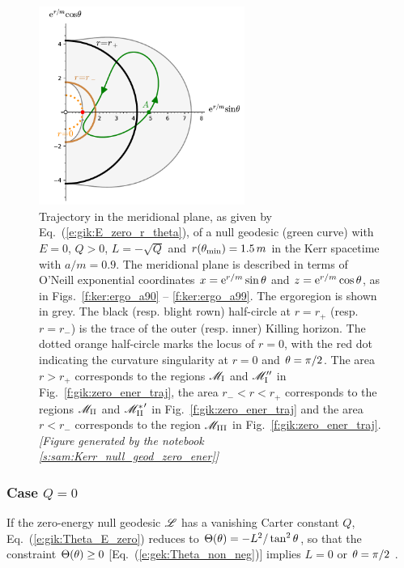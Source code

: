 \begin{figure}
\centerline{\includegraphics[width=0.6\textwidth]{gik_zero_ener_merid.pdf}}
\caption[]{\label{f:gik:zero_ener_merid} \footnotesize
Trajectory in the meridional plane, as given by Eq.~(\ref{e:gik:E_zero_r_theta}), of a null geodesic (green curve)
with $E=0$, $Q>0$, $L = - \sqrt{Q}$ and $r(\theta_{\rm min}) = 1.5 \, m$
in the Kerr spacetime with $a/m = 0.9$.
The meridional plane is described in terms of
O'Neill exponential coordinates $x = \mathrm{e}^{r/m}\sin\theta$ and $z = \mathrm{e}^{r/m}\cos\theta$,
as in Figs.~\ref{f:ker:ergo_a90} -- \ref{f:ker:ergo_a99}.
The ergoregion is shown in grey.
The black (resp. blight rown) half-circle at $r=r_+$ (resp. $r=r_-$)
is the trace of the outer (resp. inner) Killing horizon.
The dotted orange half-circle marks the locus of $r=0$, with the
red dot indicating the curvature singularity at $r=0$ and $\theta=\pi/2$.
The area $r> r_+$
corresponds to the regions $\mathscr{M}_{\rm I}$ and $\mathscr{M}_{\rm I}''$ in Fig.~\ref{f:gik:zero_ener_traj},
the area  $r_- < r < r_+$
corresponds to the regions $\mathscr{M}_{\rm II}$ and ${\mathscr{M}_{\rm II}^*}'$  in Fig.~\ref{f:gik:zero_ener_traj} and the area $r < r_-$
corresponds to the region $\mathscr{M}_{\rm III}$ in Fig.~\ref{f:gik:zero_ener_traj}.
\textsl{[Figure generated by the notebook \ref{s:sam:Kerr_null_geod_zero_ener}]}
}
\end{figure}

\subsubsection{Case $Q=0$}

If the zero-energy null geodesic $\mathscr{L}$ has a vanishing Carter constant $Q$, Eq.~(\ref{e:gik:Theta_E_zero}) reduces to $\Theta(\theta) = -L^2 / \tan^2\theta$,
so that the constraint $\Theta(\theta) \geq 0$ [Eq.~(\ref{e:gek:Theta_non_neg})]
implies $L=0$ or $\theta = \pi/2$ .

